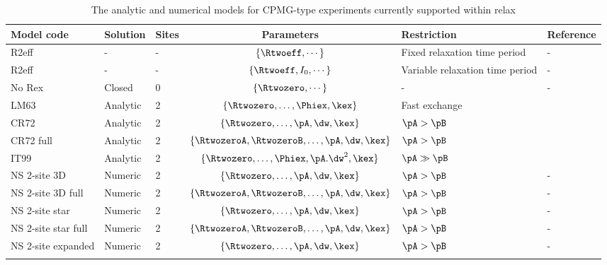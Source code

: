 \begin{table}
\begin{center}
\caption{The analytic and numerical models for CPMG-type experiments currently supported within relax}
\begin{tabular}{lllcll}
\toprule
Model code          & Solution & Sites & Parameters                                          & Restriction                       & Reference \\
\midrule                               
R2eff               & -        & -     & $\{\Rtwoeff, \cdots\}$                              & Fixed relaxation time period      & - \\
R2eff               & -        & -     & $\{\Rtwoeff, I_0, \cdots\}$                         & Variable relaxation time period   & - \\
No Rex              & Closed   & 0     & $\{\Rtwozero, \cdots\}$                             & -                                 & - \\
LM63                & Analytic & 2     & $\{\Rtwozero, \dots, \Phiex, \kex\}$                & Fast exchange                     & \citet{LuzMeiboom63} \\
CR72                & Analytic & 2     & $\{\Rtwozero, \dots, \pA, \dw, \kex\}$              & $\pA > \pB$                       & \citet{CarverRichards72} \\
CR72 full           & Analytic & 2     & $\{\RtwozeroA, \RtwozeroB, \dots, \pA, \dw, \kex\}$ & $\pA > \pB$                       & \citet{CarverRichards72} \\
IT99                & Analytic & 2     & $\{\Rtwozero, \dots, \Phiex, \pA.\dw^2, \kex\}$     & $\pA \gg \pB$                     & \citet{IshimaTorchia99} \\
NS 2-site 3D        & Numeric  & 2     & $\{\Rtwozero, \dots, \pA, \dw, \kex\}$              & $\pA > \pB$                       & - \\
NS 2-site 3D full   & Numeric  & 2     & $\{\RtwozeroA, \RtwozeroB, \dots, \pA, \dw, \kex\}$ & $\pA > \pB$                       & - \\
NS 2-site star      & Numeric  & 2     & $\{\Rtwozero, \dots, \pA, \dw, \kex\}$              & $\pA > \pB$                       & - \\
NS 2-site star full & Numeric  & 2     & $\{\RtwozeroA, \RtwozeroB, \dots, \pA, \dw, \kex\}$ & $\pA > \pB$                       & - \\
NS 2-site expanded  & Numeric  & 2     & $\{\Rtwozero, \dots, \pA, \dw, \kex\}$              & $\pA > \pB$                       & - \\
\bottomrule
\label{table: CPMG dispersion models}
\end{tabular}
\end{center}
\end{table}


